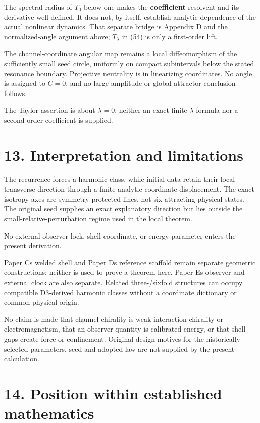 \documentclass[
  11pt,
  a4paper,
]{article}
\begin{document}
The spectral radius of \(T_0\) below one makes the \textbf{coefficient} resolvent and its derivative well defined. It does not, by itself, establish analytic dependence of the actual nonlinear dynamics. That separate bridge is Appendix D and the normalized-angle argument above; \(T_\lambda\) in (54) is only a first-order lift.

The channel-coordinate angular map remains a local diffeomorphism of the sufficiently small seed circle, uniformly on compact subintervals below the stated resonance boundary. Projective neutrality is in linearizing coordinates. No angle is assigned to \(C=0\), and no large-amplitude or global-attractor conclusion follows.

The Taylor assertion is about \(\lambda=0\); neither an exact finite-\(\lambda\) formula nor a second-order coefficient is supplied.

\section{13. Interpretation and limitations}\label{interpretation-and-limitations}

The recurrence forces a harmonic class, while initial data retain their local transverse direction through a finite analytic coordinate displacement. The exact isotropy axes are symmetry-protected lines, not six attracting physical states. The original seed supplies an exact explanatory direction but lies outside the small-relative-perturbation regime used in the local theorem.

No external observer-lock, shell-coordinate, or energy parameter enters the present derivation.

Paper C\textquotesingle s welded shell and Paper D\textquotesingle s reference scaffold remain separate geometric constructions; neither is used to prove a theorem here. Paper E\textquotesingle s observer and external clock are also separate. Related three-/sixfold structures can occupy compatible D3-derived harmonic classes without a coordinate dictionary or common physical origin.

No claim is made that channel chirality is weak-interaction chirality or electromagnetism, that an observer quantity is calibrated energy, or that shell gaps create force or confinement. Original design motives for the historically selected parameters, seed and adopted law are not supplied by the present calculation.

\section{14. Position within established mathematics}\label{position-within-established-mathematics}
\end{document}
